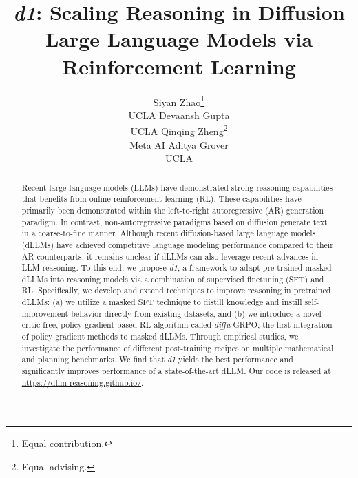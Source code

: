 \documentclass{article}
\title{ \emph{d1}: Scaling Reasoning in Diffusion Large Language Models via Reinforcement Learning}
\author{%
  Siyan Zhao\thanks{Equal contribution.} \\
  UCLA
  \And
  Devaansh Gupta\footnotemark[1] \\
  UCLA
  \And
  Qinqing Zheng\thanks{Equal advising.} \\
  Meta AI
  \And
  Aditya Grover\footnotemark[2] \\
  UCLA
}
\newcommand{\grpo}{\emph{diffu}-GRPO\xspace}
\begin{document}
\maketitle


\begin{abstract}


Recent large language models (LLMs) have demonstrated strong reasoning capabilities that benefits from online reinforcement learning (RL).
These capabilities have primarily been demonstrated within the left-to-right autoregressive (AR) generation paradigm. 
In contrast, non-autoregressive paradigms based on diffusion generate text in a coarse-to-fine manner. Although recent diffusion-based large language models (dLLMs) have achieved competitive language modeling performance compared to their AR counterparts, it remains unclear if dLLMs can also leverage recent advances in LLM reasoning.
To this end, we propose \emph{d1}, a framework to adapt pre-trained masked dLLMs into reasoning models via a combination of supervised finetuning (SFT) and RL.
Specifically, we develop and extend techniques to improve reasoning in pretrained dLLMs: (a) we utilize a masked SFT technique to distill knowledge and instill self-improvement behavior directly from existing datasets, and (b) we introduce a novel critic-free, policy-gradient based RL algorithm called \grpo, the first integration of policy gradient methods to masked dLLMs. Through empirical studies, we investigate the performance of different post-training recipes on multiple mathematical and planning benchmarks. We find that \emph{d1} yields the best performance and significantly improves performance of a state-of-the-art dLLM. Our code is released at \url{https://dllm-reasoning.github.io/}.


\end{abstract}









\newpage


\clearpage







\end{document}
